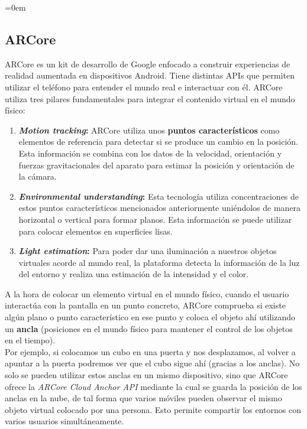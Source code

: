 \parindent=0em
\subsection{ARCore}
\noindent

ARCore es un kit de desarrollo de Google \cite{ARCoreOverview} enfocado a construir experiencias de realidad aumentada en dispositivos Android. Tiene distintas APIs que permiten utilizar el teléfono para entender el mundo real e interactuar con él. ARCore utiliza tres pilares fundamentales para integrar el contenido virtual en el mundo físico:

\begin{enumerate}[label=\arabic*)]
    \item \textbf{\textit{Motion tracking}:} ARCore utiliza unos \textbf{puntos característicos} como elementos de referencia para detectar si se produce un cambio en la posición. Esta información se combina con los datos de la velocidad, orientación y fuerzas gravitacionales del aparato para estimar la posición y orientación de la cámara.
    
     \item \textbf{\textit{Environmental understanding}:} Esta tecnología utiliza concentraciones de estos puntos característicos mencionados anteriormente uniéndolos de manera horizontal o vertical para formar planos. Esta información se puede utilizar para colocar elementos en superficies lisas.
     
     \item \textbf{\textit{Light estimation}:} Para poder dar una iluminación a nuestros objetos virtuales acorde al mundo real, la plataforma detecta la información de la luz del entorno y realiza una estimación de la intensidad y el color.
\end{enumerate}

A la hora de colocar un elemento virtual en el mundo físico, cuando el usuario interactúa con la pantalla en un punto concreto, ARCore comprueba si existe algún plano o punto característico en ese punto y coloca el objeto ahí utilizando un \textbf{ancla} (posiciones en el mundo físico para mantener el control de los objetos en el tiempo).\\

Por ejemplo, si colocamos un cubo en una puerta y nos desplazamos, al volver a apuntar a la puerta podremos ver que el cubo sigue ahí (gracias a los anclas). No solo se pueden utilizar estos anclas en un mismo dispositivo, sino que ARCore ofrece la \textit{ARCore Cloud Anchor API} mediante la cual se guarda la posición de los anclas en la nube, de tal forma que varios móviles pueden observar el mismo objeto virtual colocado por una persona. Esto permite compartir los entornos con varios usuarios simultáneamente.\\

